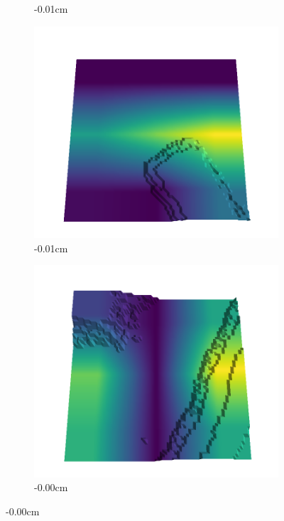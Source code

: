 \documentclass[../document.tex]{subfiles}
\begin{document}
\begin{figure}[H]
\begin{subfigure}[b]{0.242\linewidth}
        \caption{-0.01cm}
        \end{subfigure}
        \begin{subfigure}[b]{0.242\linewidth}
        \includegraphics[width=\linewidth]{../img/5/quarry/false_negative/18-patch-3d-majavi-colormap-90.png}
        \caption{-0.01cm}
        \end{subfigure}
        \begin{subfigure}[b]{0.242\linewidth}
        \includegraphics[width=\linewidth]{../img/5/quarry/false_negative/19-patch-3d-majavi-colormap-95.png}
        \caption{-0.00cm}
        \end{subfigure}
        \end{figure}
\end{document}
